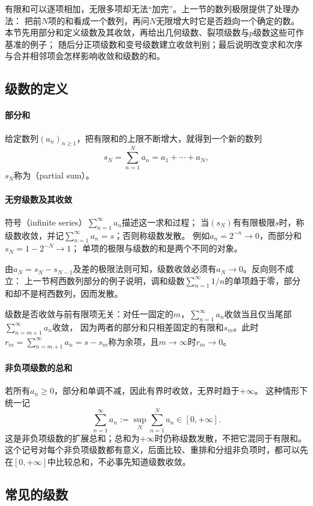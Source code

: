 有限和可以逐项相加，无限多项却无法“加完”。上一节的数列极限提供了处理办法：
把前$N$项的和看成一个数列，再问$N$无限增大时它是否趋向一个确定的数。
本节先用部分和定义级数及其收敛，再给出几何级数、裂项级数与$p$级数这些可作基准的例子；
随后分正项级数和变号级数建立收敛判别；最后说明改变求和次序与合并相邻项会怎样影响收敛和级数的和。

\subsection{级数的定义}
\label{sec:analysis-series-definition}

\paragraph{部分和}
给定数列$(a_n)_{n\geq1}$，把有限和的上限不断增大，就得到一个新的数列
\[
 s_N=\sum_{n=1}^{N}a_n=a_1+\cdots+a_N,
\]
$s_N$称为（partial sum）。

\paragraph{无穷级数及其收敛}
符号（infinite series）$\sum_{n=1}^{\infty}a_n$描述这一求和过程；
当$(s_N)$有有限极限$s$时，称级数收敛，并记$\sum_{n=1}^{\infty}a_n=s$；否则称级数发散。
例如$a_n=2^{-n}\to0$，而部分和$s_N=1-2^{-N}\to1$；
单项的极限与级数的和是两个不同的对象。

由$a_N=s_N-s_{N-1}$及差的极限法则可知，级数收敛必须有$a_N\to0$。反向则不成立：
上一节柯西数列部分的例子说明，调和级数$\sum_{n=1}^\infty1/n$的单项趋于零，部分和却不是柯西数列，因而发散。

级数是否收敛与前有限项无关：对任一固定的$m$，$\sum_{n=1}^\infty a_n$收敛当且仅当尾部$\sum_{n=m+1}^\infty a_n$收敛，
因为两者的部分和只相差固定的有限和$s_m$。此时$r_m=\sum_{n=m+1}^\infty a_n=s-s_m$称为余项，且$m\to\infty$时$r_m\to0$。

\paragraph{非负项级数的总和}
若所有$a_n\geq0$，部分和单调不减，因此有界时收敛，无界时趋于$+\infty$。
这种情形下统一记
\[
 \sum_{n=1}^{\infty}a_n:=\sup_N\sum_{n=1}^{N}a_n\in[0,+\infty].
\]
这是非负项级数的扩展总和；总和为$+\infty$时仍称级数发散，不把它混同于有限和。
这个记号对每个非负项级数都有意义，后面比较、重排和分组非负项时，都可以先在$[0,+\infty]$中比较总和，不必事先知道级数收敛。

\subsection{常见的级数}
\label{sec:analysis-common-series}

